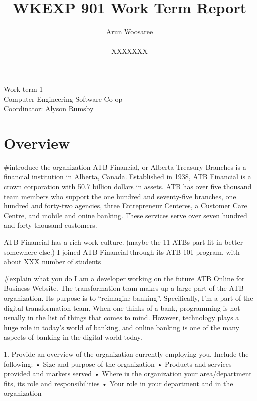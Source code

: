 \documentclass[letterpaper,12pt]{article}
\title{WKEXP 901 Work Term Report}
\author{Arun Woosaree \\ \\  XXXXXXX}
\begin{document}
\begin{titlepage}
 \maketitle
 \thispagestyle{empty}
 \centering
 \large
 \vspace{1cm}
 Work term 1\\
 \vspace{1cm}
 Computer Engineering Software Co-op \\
 \vspace{1cm}
 Coordinator: Alyson Rumsby
\end{titlepage}

\section{Overview}

\#introduce the organization
ATB Financial, or Alberta Treasury Branches is a financial institution in Alberta, Canada.
Established in 1938, ATB Financial is a crown corporation with 50.7 billion dollars in assets.\cite{annualreport2018}
ATB has over five thousand team members who support the one hundred and seventy-five branches, one hundred and forty-two
agencies, three Entrepreneur Centeres, a Customer Care Centre, and mobile and onine banking.
These services serve over seven hundred and forty thousand customers. \cite{annualreport2017, annualreport2018}

ATB Financial has a rich work culture. (maybe the 11 ATBs part fit in better somewhere else.)
I joined ATB Financial through its ATB 101 program, with about XXX\cite{} number of students

\#explain what you do
I am a developer working on the future ATB Online for Business Website.
The transformation team makes up a large part of the ATB organization. Its purpose is to ``reimagine banking''.
Specifically, I'm a part of the digital transformation team. When one thinks of a bank,
programming is not usually in the list of things that comes to mind. However, technology
plays a huge role in today's world of banking, and online banking is one of the many
aspects of banking in the digital world today.

1.	Provide an overview of the organization currently employing you. Include the following:
•	Size and purpose of the organization
•	Products and services provided and markets served
•	Where in the organization your area/department fits, its role and responsibilities
•	Your role in your department and in the organization
\end{document}
